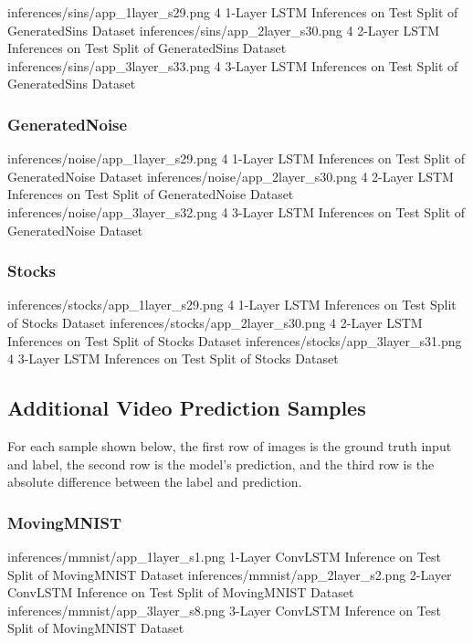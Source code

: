 \documentclass{scrartcl}
\begin{document}
\threefig
{inferences/sins/app_1layer_s29.png}
{4 1-Layer LSTM Inferences on Test Split of GeneratedSins Dataset}
{inferences/sins/app_2layer_s30.png}
{4 2-Layer LSTM Inferences on Test Split of GeneratedSins Dataset}
{inferences/sins/app_3layer_s33.png}
{4 3-Layer LSTM Inferences on Test Split of GeneratedSins Dataset}

\subsubsection{GeneratedNoise}
\label{subsubsec:additional_noise_inferences}

\threefig
{inferences/noise/app_1layer_s29.png}
{4 1-Layer LSTM Inferences on Test Split of GeneratedNoise Dataset}
{inferences/noise/app_2layer_s30.png}
{4 2-Layer LSTM Inferences on Test Split of GeneratedNoise Dataset}
{inferences/noise/app_3layer_s32.png}
{4 3-Layer LSTM Inferences on Test Split of GeneratedNoise Dataset}

\subsubsection{Stocks}
\label{subsubsec:additional_stocks_inferences}

\threefig
{inferences/stocks/app_1layer_s29.png}
{4 1-Layer LSTM Inferences on Test Split of Stocks Dataset}
{inferences/stocks/app_2layer_s30.png}
{4 2-Layer LSTM Inferences on Test Split of Stocks Dataset}
{inferences/stocks/app_3layer_s31.png}
{4 3-Layer LSTM Inferences on Test Split of Stocks Dataset}

\newpage
\subsection{Additional Video Prediction Samples}
\label{subsec:additional_video_inferences}

For each sample shown below, the first row of images is the ground truth input
and label, the second row is the model's prediction, and the third row is the
absolute difference between the label and prediction.

\subsubsection{MovingMNIST}
\label{subsubsec:additional_mmnist_inferences}

\threefig
{inferences/mmnist/app_1layer_s1.png}
{1-Layer ConvLSTM Inference on Test Split of MovingMNIST Dataset}
{inferences/mmnist/app_2layer_s2.png}
{2-Layer ConvLSTM Inference on Test Split of MovingMNIST Dataset}
{inferences/mmnist/app_3layer_s8.png}
{3-Layer ConvLSTM Inference on Test Split of MovingMNIST Dataset}
\end{document}
